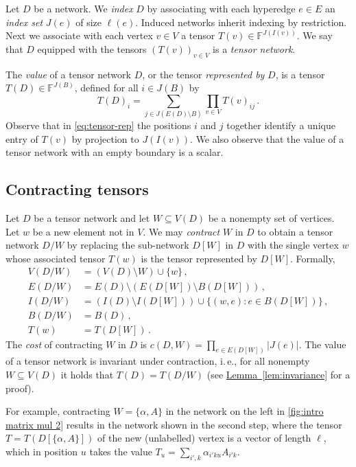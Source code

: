 \documentclass[11pt]{article}
\numberwithin{equation}{section}
\theoremstyle{definition}
\theoremstyle{plain}
\newcommand{\ie}{i.\,e.}
\newcommand{\expref}[2]{\hyperref[#2]{#1~\ref{#2}}}
\newcommand{\F}{\ensuremath{\mathbb{F}}}
\begin{document}
Let $D$ be a network.
We \emph{index} $D$ by associating with each hyperedge $e \in E$ an \emph{index set} $J(e)$ of size $\ell(e)$.  Induced networks inherit indexing by restriction.
Next we associate with each vertex $v\in V$ a tensor
$T(v)\in\F^{J(I(v))}$. We say that $D$ equipped with the tensors
$(T(v))_{v \in V}$ is a \emph{tensor network}.

The \emph{value} of a tensor network $D$, or the tensor \emph{represented by} $D$, is a tensor $T(D) \in \F^{J(B)}$, defined for all $i \in J(B)$ by
\begin{equation}
\label{eq:tensor-rep}
T(D)_i=
\sum_{j\in J(E(D)\setminus B)}
\prod_{v\in V}T(v)_{ij}\,.
\end{equation}
Observe that in \eqref{eq:tensor-rep}
the positions $i$ and $j$ together identify a unique entry of $T(v)$
by projection to $J(I(v))$.
We also observe that the value of a tensor network with an empty boundary is a scalar.

\subsection{Contracting tensors}

Let $D$ be a tensor network and let $W\subseteq V(D)$ be a nonempty set
of vertices. Let $w$ be a new element not in $V$.
We may \emph{contract} $W$ in $D$ to obtain a tensor network $D/W$ by replacing the sub-network $D[W]$ in $D$ with the single vertex $w$ whose associated tensor $T(w)$ is the tensor represented by $D[W]$.  Formally,
\begin{equation}
\label{eq:contraction}
\begin{aligned}
V(D/W)&=(V(D)\setminus W)\cup\{w\}\,,\\
E(D/W)&=E(D)\setminus\left(E(D[W])\setminus B(D[W])\right)\,,\\
I(D/W)&=\left(I(D)\setminus I(D[W])\right)\cup\{(w,e):e\in B(D[W])\}\,,\\
B(D/W)&=B(D)\,,\\
T(w)&=T(D[W])\,.
\end{aligned}
\end{equation}
The \emph{cost} of contracting $W$ in $D$ is
$c(D,W)=\prod_{e\in E(D[W])}|J(e)|$.
The value of a tensor network is invariant under contraction, \ie,
for all nonempty $W\subseteq V(D)$ it holds that $T(D)=T(D/W)$ (see
\expref{Lemma}{lem:invariance} for a proof).

For example, contracting $W = \{\alpha, A\}$ in the network on the
left in \eqref{fig:intro matrix mul 2} results in the network shown in
the second step, where the tensor $T = T(D[\{\alpha, A\}])$ of the new (unlabelled) vertex
is a vector of length $\ell$, which in position $u$ takes the value
$T_u = \sum_{i', k} \alpha_{i'ku} A_{i'k}$.
\end{document}
